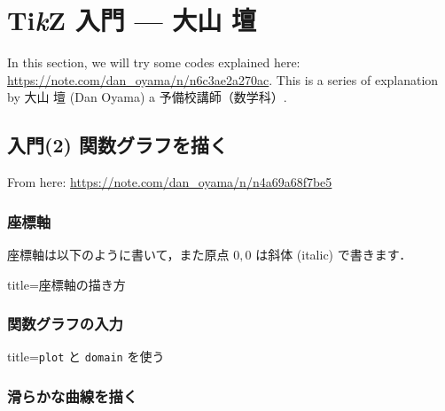 \documentclass[../geometrymemo.tex]{subfiles}
\begin{document}
\section{Ti\textit{k}Z 入門 --- 大山 壇}
\label{sec:danoyama}

In this section, we will try some codes explained here: \url{https://note.com/dan_oyama/n/n6c3ae2a270ac}.
This is a series of explanation by 大山 壇 (Dan Oyama) a 予備校講師（数学科）.


\subsection{入門(2) 関数グラフを描く}

From here: \url{https://note.com/dan_oyama/n/n4a69a68f7be5}

\subsubsection{座標軸}

座標軸は以下のように書いて，また原点 \(0,0\) は斜体 (italic) で書きます．
\begin{tcblisting}{title=座標軸の描き方}
\end{tcblisting}

\subsubsection{関数グラフの入力}

\begin{tcblisting}{title=\texttt{plot} と \texttt{domain} を使う}
\end{tcblisting}

\subsubsection{滑らかな曲線を描く}
\end{document}
